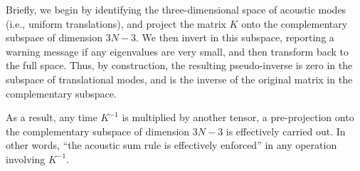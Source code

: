 \documentclass[11pt,fleqn]{article}
\def\wt#1{\widetilde{#1}}
\def\E{{\cal E}}
\begin{document}
Briefly, we begin by identifying the three-dimensional space of
acoustic modes (i.e., uniform translations), and project the
matrix $K$ onto the complementary subspace of dimension $3N-3$.
We then invert in this subspace, reporting a warning message if
any eigenvalues are very small, and then transform back to the
full space.  Thus, by construction, the resulting pseudo-inverse
is zero in the subspace of translational modes, and is the inverse
of the original matrix in the complementary subspace.

As a result, any time $K^{-1}$ is multiplied by another tensor,
a pre-projection onto the complementary subspace of dimension $3N-3$
is effectively carried out.  In other words, ``the acoustic
sum rule is effectively enforced'' in any operation involving
$K^{-1}$.

% 
% 
% 
% 
% 
% 
\end{document}
